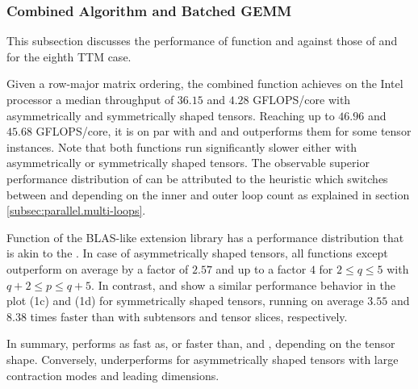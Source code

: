 \subsubsection{Combined Algorithm and Batched GEMM}
This subsection discusses the performance of function  and  against those of  and  for the eighth TTM case.

Given a row-major matrix ordering, the combined function  achieves on the Intel processor a median throughput of $36.15$ and $4.28$ GFLOPS/core with asymmetrically and symmetrically shaped tensors.
Reaching up to $46.96$ and $45.68$ GFLOPS/core, it is on par with  and  and outperforms them for some tensor instances.
Note that both functions run significantly slower either with asymmetrically or symmetrically shaped tensors.
The observable superior performance distribution of  can be attributed to the heuristic which switches between  and  depending on the inner and outer loop count as explained in section \ref{subsec:parallel.multi-loops}.

Function  of the BLAS-like extension library has a performance distribution that is akin to the .
In case of asymmetrically shaped tensors, all functions except  outperform  on average by a factor of $2.57$ and up to a factor $4$ for $2 \leq q\leq5$ with $q+2 \leq p \leq q+5$. %
In contrast,  and  show a similar performance behavior in the plot (1c) and (1d) for symmetrically shaped tensors, running on average $3.55$ and $8.38$ times faster than  with subtensors and tensor slices, respectively.

In summary,  performs as fast as, or faster than,  and , depending on the tensor shape. 
Conversely,  underperforms for asymmetrically shaped tensors with large contraction modes and leading dimensions.

